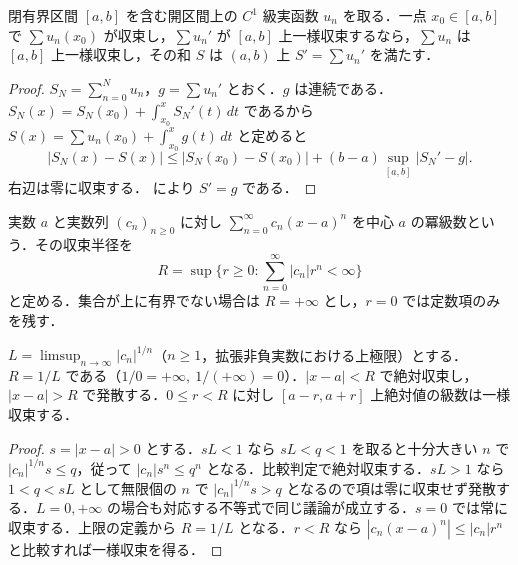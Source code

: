 \begin{prop}[函数級数の項別微分]
閉有界区間 $[a,b]$ を含む開区間上の $C^1$ 級実函数 $u_n$ を取る．一点 $x_0\in[a,b]$ で $\sum u_n(x_0)$ が収束し，$\sum u_n'$ が $[a,b]$ 上一様収束するなら，$\sum u_n$ は $[a,b]$ 上一様収束し，その和 $S$ は $(a,b)$ 上 $S'=\sum u_n'$ を満たす．
\end{prop}
\begin{proof}
$S_N=\sum_{n=0}^Nu_n$，$g=\sum u_n'$ とおく．$g$ は連続である．$S_N(x)=S_N(x_0)+\int_{x_0}^xS_N'(t)\,dt$ であるから $S(x)=\sum u_n(x_0)+\int_{x_0}^xg(t)\,dt$ と定めると
\[
|S_N(x)-S(x)|\leq |S_N(x_0)-S(x_0)|+(b-a)\sup_{[a,b]}|S_N'-g|.
\]
右辺は零に収束する． により $S'=g$ である．
\end{proof}
\begin{defn}[冪級数と収束半径]
実数 $a$ と実数列 $(c_n)_{n\geq0}$ に対し $\sum_{n=0}^\infty c_n(x-a)^n$ を中心 $a$ の冪級数という．その収束半径を
\[
R=\sup\{r\geq0:\sum_{n=0}^\infty|c_n|r^n<\infty\}
\]
と定める．集合が上に有界でない場合は $R=+\infty$ とし，$r=0$ では定数項のみを残す．
\end{defn}
\begin{prop}
$L=\limsup_{n\to\infty}|c_n|^{1/n}$（$n\geq1$，拡張非負実数における上極限）とする．$R=1/L$ である（$1/0=+\infty,\ 1/(+\infty)=0$）．$|x-a|<R$ で絶対収束し，$|x-a|>R$ で発散する．$0\leq r<R$ に対し $[a-r,a+r]$ 上絶対値の級数は一様収束する．
\end{prop}
\begin{proof}
$s=|x-a|>0$ とする．$sL<1$ なら $sL<q<1$ を取ると十分大きい $n$ で $|c_n|^{1/n}s\leq q$，従って $|c_n|s^n\leq q^n$ となる．比較判定で絶対収束する．$sL>1$ なら $1<q<sL$ として無限個の $n$ で $|c_n|^{1/n}s>q$ となるので項は零に収束せず発散する．$L=0,+\infty$ の場合も対応する不等式で同じ議論が成立する．$s=0$ では常に収束する．上限の定義から $R=1/L$ となる．$r<R$ なら $|c_n(x-a)^n|\leq|c_n|r^n$ と比較すれば一様収束を得る．
\end{proof}
